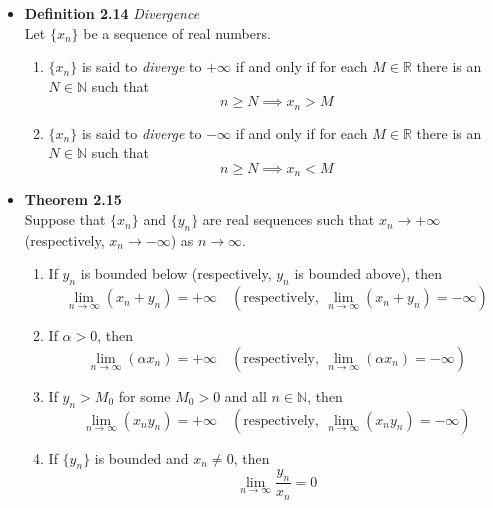 \documentclass[11pt,a4paper]{article}
\begin{document}
\begin{itemize}
\begin{enumerate}
        \end{enumerate}

    \item \textbf{Definition 2.14} \emph{Divergence} \\
        Let $\{x_n\}$ be a sequence of real numbers.
        \begin{enumerate}
            \item $\{x_n\}$ is said to \emph{diverge} to $+\infty$ if and only if for each
                $M \in \mathbb{R}$ there is an $N \in \mathbb{N}$ such that
                \[
                    n \geq N \implies x_n > M
                \]
            \item $\{x_n\}$ is said to \emph{diverge} to $-\infty$ if and only if for each
                $M \in \mathbb{R}$ there is an $N \in \mathbb{N}$ such that
                \[
                    n \geq N \implies x_n < M
                \]
        \end{enumerate}

    \item \textbf{Theorem 2.15} \\
        Suppose that $\{x_n\}$ and $\{y_n\}$ are real sequences such that $x_n \to +\infty$
        (respectively, $x_n \to -\infty$) as $n \to \infty$.
        \begin{enumerate}
            \item If $y_n$ is bounded below (respectively, $y_n$ is bounded above), then
                \[
                    \lim_{n \to \infty} (x_n + y_n) = +\infty \quad
                    (\text{respectively}, \ \lim_{n \to \infty} (x_n + y_n) = -\infty)
                \]

            \item If $\alpha > 0$, then
                \[
                    \lim_{n \to \infty} (\alpha x_n) = +\infty \quad
                    (\text{respectively}, \ \lim_{n \to \infty} (\alpha x_n) = -\infty)
                \]

            \item If $y_n > M_0$ for some $M_0 > 0$ and all $n \in \mathbb{N}$, then
                \[
                    \lim_{n \to \infty} (x_n y_n) = +\infty \quad
                    (\text{respectively}, \ \lim_{n \to \infty} (x_n y_n) = -\infty)
                \]

            \item If $\{y_n\}$ is bounded and $x_n \neq 0$, then
                \[
                    \lim_{n \to \infty} \frac{y_n}{x_n} = 0
                \]


\end{enumerate}
\end{itemize}
\end{document}
